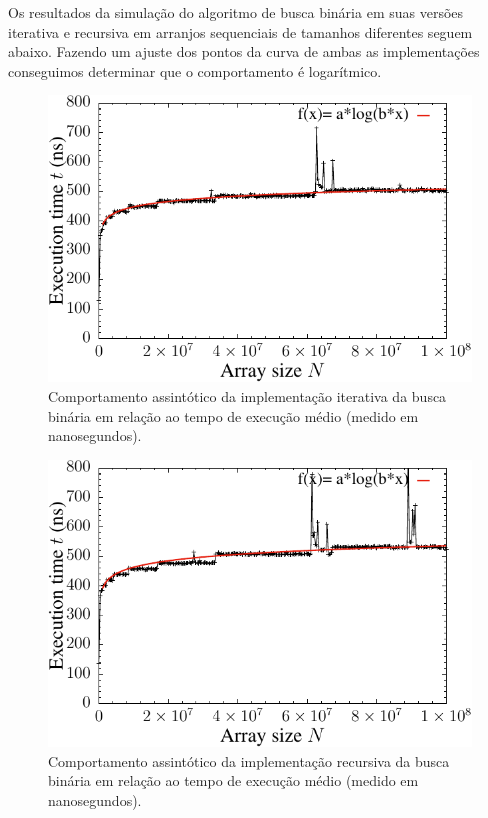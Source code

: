Os resultados da simulação do algoritmo de busca binária em suas versões iterativa e recursiva em arranjos sequenciais de tamanhos diferentes seguem abaixo. Fazendo um ajuste dos pontos da curva de ambas as implementações conseguimos determinar que o comportamento é logarítmico.
\begin{figure}[H]
  \centering
  \includegraphics[scale=1.2]{../plots/bsearch_it_time.pdf}
  \caption{Comportamento assintótico da implementação iterativa da busca binária em relação ao tempo de execução médio (medido em nanosegundos).}
   \label{fig:bseach_it_time}
\end{figure}

\begin{figure}[H]
  \centering
  \includegraphics[scale=1.2]{../plots/bsearch_rec_time.pdf}
  \caption{Comportamento assintótico da implementação recursiva da busca binária em relação ao tempo de execução médio (medido em nanosegundos).}
  \label{fig:bseach_rec_time}
\end{figure} 


